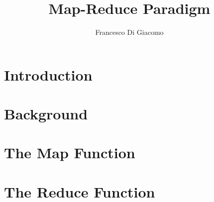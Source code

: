 \documentclass[10pt,a4paper]{article}
\author{Francesco Di Giacomo}
\date { }
\title{Map-Reduce Paradigm}
\begin{document}
	\maketitle
	\section{Introduction}
	\label{sec:intro}
	
	\section{Background}
	\label{sec:background}
	
		
	\section{The Map Function}
	\label{sec:map}
	
	
	\section{The Reduce Function}
	\label{sec:reduce}
	
\end{document}
